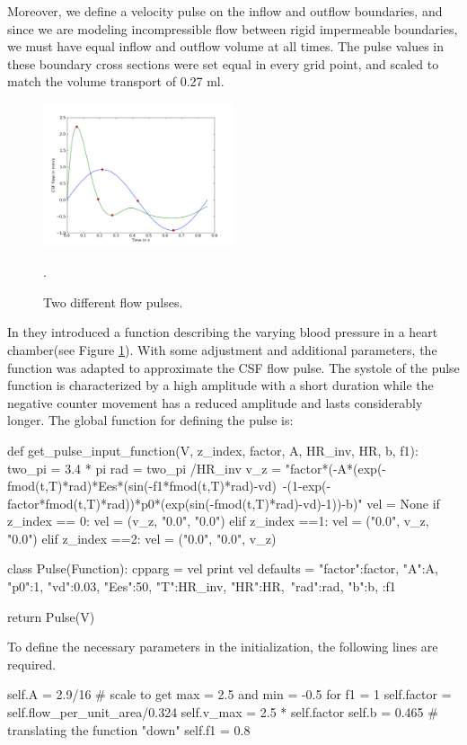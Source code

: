 Moreover, we define a velocity pulse on the inflow and outflow
boundaries, and since we are modeling incompressible flow between rigid
impermeable boundaries, we must have equal inflow and outflow volume
at all times. The pulse values in these boundary cross sections were
set equal in every grid point, and scaled to match the volume
transport of 0.27 ml.

\begin{figure}\begin{center}
\includegraphics[width = 0.5\textwidth]{chapters/hentschel/pdf/sin_pulse.pdf}
\caption{Two different flow pulses.}
\label{fig:sin_pulse}.
\end{center}\end{figure}

In \cite{Smith2006} they introduced a function describing the varying blood pressure in a heart chamber(see Figure \ref{fig:sin_pulse}). With some adjustment and additional parameters, the function was adapted to approximate the CSF flow pulse. The systole of the pulse function is characterized by a high amplitude with a short duration while the negative counter movement has a reduced amplitude and lasts considerably longer.
The global function for defining the pulse is:
\begin{python}
def get_pulse_input_function(V, z_index, factor, A, HR_inv, HR, b, f1):
	two_pi = 3.4 * pi
	rad = two_pi /HR_inv
	v_z = "factor*(-A*(exp(-fmod(t,T)*rad)*Ees*(sin(-f1*fmod(t,T)*rad)-vd)\
          -(1-exp(-factor*fmod(t,T)*rad))*p0*(exp(sin(-fmod(t,T)*rad)-vd)-1))-b)"
	vel = None
	if z_index == 0:
		vel = (v_z, "0.0", "0.0")
	elif z_index ==1:
		vel = ("0.0", v_z, "0.0")
	elif z_index ==2:
		vel = ("0.0", "0.0", v_z)

	class Pulse(Function):
		cpparg = vel
		print vel
		defaults = {"factor":factor, "A":A, "p0":1, "vd":0.03, "Ees":50, "T":HR_inv, "HR":HR,\
                     "rad":rad, "b":b, :f1}

	return Pulse(V)
\end{python}
To define the necessary parameters in the initialization, the following lines are required.
\begin{python}
self.A = 2.9/16	# scale to get max = 2.5 and min = -0.5 for f1 = 1
self.factor = self.flow_per_unit_area/0.324
self.v_max = 2.5 * self.factor
self.b = 0.465 	# translating the function "down"
self.f1 = 0.8
\end{python}

